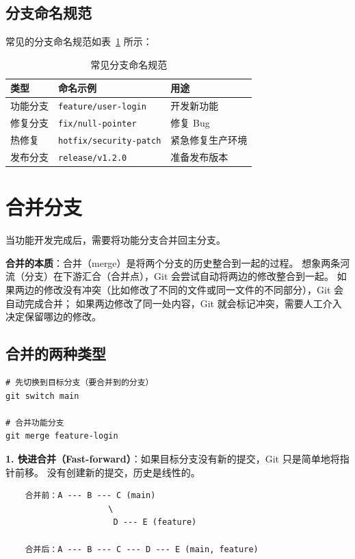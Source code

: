 \documentclass[12pt,a4paper,openany]{ctexbook}
\begin{document}
\subsection{分支命名规范}

常见的分支命名规范如表~\ref{tab:branch-naming} 所示：

\begin{table}[h]
\centering
\caption{常见分支命名规范}\label{tab:branch-naming}
\begin{tabularx}{\textwidth}{l l >{\raggedright\arraybackslash}X}
\toprule
\textbf{类型} & \textbf{命名示例} & \textbf{用途} \\
\midrule
功能分支 & \texttt{feature/user-login} & 开发新功能 \\
修复分支 & \texttt{fix/null-pointer} & 修复 Bug \\
热修复 & \texttt{hotfix/security-patch} & 紧急修复生产环境 \\
发布分支 & \texttt{release/v1.2.0} & 准备发布版本 \\
\bottomrule
\end{tabularx}
\end{table}

\section{合并分支}

当功能开发完成后，需要将功能分支合并回主分支。

\begin{infobox}
\textbf{合并的本质}：合并（merge）是将两个分支的历史整合到一起的过程。
想象两条河流（分支）在下游汇合（合并点），Git 会尝试自动将两边的修改整合到一起。
如果两边的修改没有冲突（比如修改了不同的文件或同一文件的不同部分），Git 会自动完成合并；
如果两边修改了同一处内容，Git 就会标记冲突，需要人工介入决定保留哪边的修改。
\end{infobox}

\subsection{合并的两种类型}

\begin{lstlisting}[style=shell]
# 先切换到目标分支（要合并到的分支）
git switch main

# 合并功能分支
git merge feature-login
\end{lstlisting}

\textbf{1. 快进合并（Fast-forward）}：如果目标分支没有新的提交，Git 只是简单地将指针前移。
没有创建新的提交，历史是线性的。
\begin{verbatim}
    合并前：A --- B --- C (main)
                     \
                      D --- E (feature)

    合并后：A --- B --- C --- D --- E (main, feature)
\end{verbatim}
\end{document}
